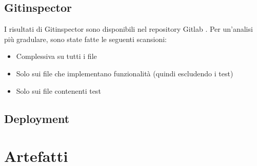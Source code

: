 \documentclass[11pt]{article}
\begin{document}
\subsection{Gitinspector}
I risultati di Gitinspector sono disponibili nel repository Gitlab \cite{gitinspector}. 
Per un'analisi più gradulare, sono state fatte le seguenti scansioni:
\begin{itemize}
    \item Complessiva su tutti i file
    \item Solo sui file che implementano funzionalità (quindi escludendo i test)
    \item Solo sui file contenenti test
\end{itemize}


\subsection{Deployment}



\newpage
\section{Artefatti}


\end{document}
